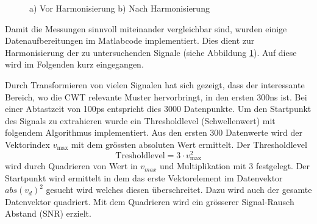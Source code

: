 \begin{refsection}
\begin{figure}
	\begin{subfigure}
		\centering
	\end{subfigure}
	\begin{subfigure}
		\centering
	\end{subfigure}	
\caption{a) Vor Harmonisierung b) Nach Harmonisierung}
\label{fig:Zeitsig}
\end{figure}

Damit die Messungen sinnvoll miteinander vergleichbar sind, wurden einige Datenaufbereitungen im Matlabcode implementiert.
Dies dient zur Harmonisierung der zu untersuchenden Signale (siehe Abbildung \ref{fig:Zeitsig}). 
Auf diese wird im Folgenden kurz eingegangen.

Durch Transformieren von vielen Signalen hat sich gezeigt, dass der interessante Bereich, wo die CWT relevante Muster hervorbringt, in den ersten 300ns ist.
Bei einer Abtastzeit von 100ps entspricht dies 3000 Datenpunkte.
Um den Startpunkt des Signals zu extrahieren wurde ein Thresholdlevel (Schwellenwert) mit folgendem Algorithmus implementiert.
Aus den ersten 300 Datenwerte wird der Vektorindex $v_\text{max}$ mit dem grössten absoluten Wert ermittelt.
Der Thresholdlevel
\begin{equation}
\text{Tresholdlevel} = 3\cdot v_\text{max}^2
\end{equation}
wird durch Quadrieren von Wert in $v_{max}$ und Multiplikation mit 3 festgelegt.
Der Startpunkt wird ermittelt in dem das erste Vektorelement im Datenvektor $abs(v_d)^2$ gesucht wird welches diesen überschreitet.
Dazu wird auch der gesamte Datenvektor quadriert.
Mit dem Quadrieren wird ein grösserer Signal-Rausch Abstand (SNR) erzielt.


\end{refsection}
